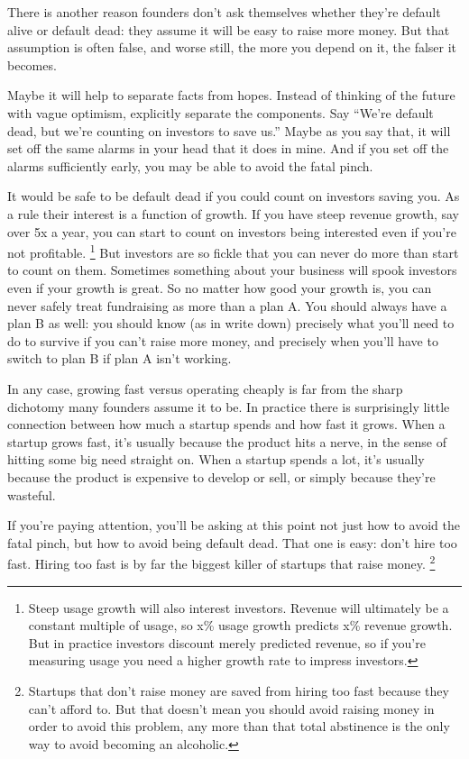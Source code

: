 There is another reason founders don't ask themselves whether they're
default alive or default dead: they assume it will be easy to raise more
money. But that assumption is often false, and worse still, the more you
depend on it, the falser it becomes.

Maybe it will help to separate facts from hopes. Instead of thinking of
the future with vague optimism, explicitly separate the components. Say
``We're default dead, but we're counting on investors to save us.''
Maybe as you say that, it will set off the same alarms in your head that
it does in mine. And if you set off the alarms sufficiently early, you
may be able to avoid the fatal pinch.

It would be safe to be default dead if you could count on investors
saving you. As a rule their interest is a function of growth. If you
have steep revenue growth, say over 5x a year, you can start to count on
investors being interested even if you're not profitable.
\footnote{Steep usage growth will also interest investors. Revenue will
ultimately be a constant multiple of usage, so x\% usage growth predicts
x\% revenue growth. But in practice investors discount merely predicted
revenue, so if you're measuring usage you need a higher growth rate to
impress investors.} But investors are so fickle that you can never
do more than start to count on them. Sometimes something about your
business will spook investors even if your growth is great. So no matter
how good your growth is, you can never safely treat fundraising as more
than a plan A. You should always have a plan B as well: you should know
(as in write down) precisely what you'll need to do to survive if you
can't raise more money, and precisely when you'll have to switch to plan
B if plan A isn't working.

In any case, growing fast versus operating cheaply is far from the sharp
dichotomy many founders assume it to be. In practice there is
surprisingly little connection between how much a startup spends and how
fast it grows. When a startup grows fast, it's usually because the
product hits a nerve, in the sense of hitting some big need straight on.
When a startup spends a lot, it's usually because the product is
expensive to develop or sell, or simply because they're wasteful.

If you're paying attention, you'll be asking at this point not just how
to avoid the fatal pinch, but how to avoid being default dead. That one
is easy: don't hire too fast. Hiring too fast is by far the biggest
killer of startups that raise money. \footnote{Startups that don't raise money are saved from hiring too fast
because they can't afford to. But that doesn't mean you should avoid
raising money in order to avoid this problem, any more than that total
abstinence is the only way to avoid becoming an alcoholic.}

